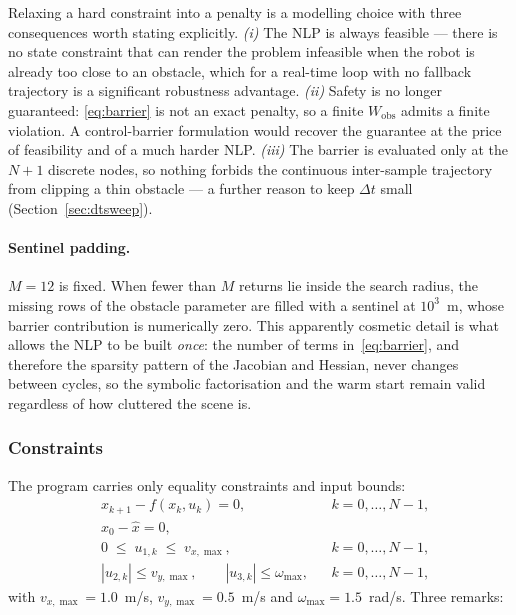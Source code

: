\documentclass[11pt,a4paper]{article}
\newcommand{\Wobs}{W_{\mathrm{obs}}}
\begin{document}
Relaxing a hard constraint into a penalty is a modelling choice with three consequences worth stating
explicitly. \emph{(i)} The NLP is always feasible --- there is no state constraint that can render the
problem infeasible when the robot is already too close to an obstacle, which for a real-time loop with no
fallback trajectory is a significant robustness advantage. \emph{(ii)} Safety is no longer guaranteed:
\eqref{eq:barrier} is not an exact penalty, so a finite $\Wobs$ admits a finite violation. A control-barrier
formulation \cite{ames2019cbf} would recover the guarantee at the price of feasibility and of a much harder
NLP. \emph{(iii)} The barrier is evaluated only at the $N+1$ discrete nodes, so nothing forbids the continuous
inter-sample trajectory from clipping a thin obstacle --- a further reason to keep $\Delta t$ small
(Section~\ref{sec:dtsweep}).

\paragraph{Sentinel padding.} $M=12$ is fixed. When fewer than $M$ returns lie inside the search radius, the
missing rows of the obstacle parameter are filled with a sentinel at $10^3$~m, whose barrier contribution is
numerically zero. This apparently cosmetic detail is what allows the NLP to be built \emph{once}: the number
of terms in~\eqref{eq:barrier}, and therefore the sparsity pattern of the Jacobian and Hessian, never changes
between cycles, so the symbolic factorisation and the warm start remain valid regardless of how cluttered the
scene is.

\subsubsection{Constraints}
\label{sec:constraints}

The program carries only equality constraints and input bounds:
\begin{subequations}
\label{eq:cons}
\begin{align}
  & x_{k+1}-f(x_k,u_k)=0, && k=0,\dots,N-1, \label{eq:cons-dyn}\\
  & x_0-\hat x=0, \label{eq:cons-init}\\
  & 0\;\le\;u_{1,k}\;\le\;v_{x,\max}, && k=0,\dots,N-1, \label{eq:cons-vx}\\
  & |u_{2,k}|\le v_{y,\max},\qquad |u_{3,k}|\le\omega_{\max}, && k=0,\dots,N-1, \label{eq:cons-vyw}
\end{align}
\end{subequations}
with $v_{x,\max}=1.0$~m/s, $v_{y,\max}=0.5$~m/s and $\omega_{\max}=1.5$~rad/s. Three remarks:
\end{document}
